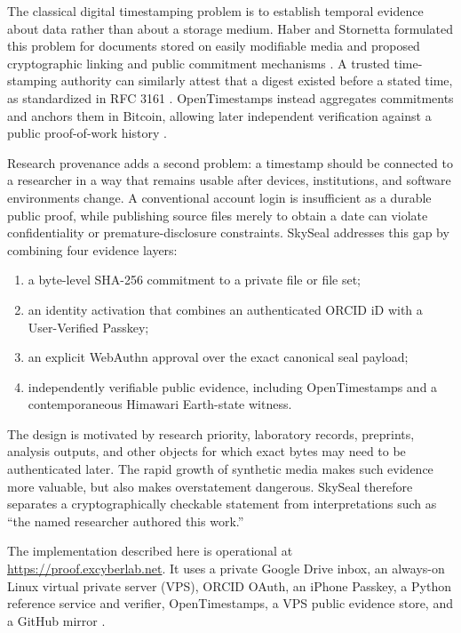 \documentclass[11pt,a4paper]{article}
\begin{document}
The classical digital timestamping problem is to establish temporal evidence about data rather than about a storage medium. Haber and Stornetta formulated this problem for documents stored on easily modifiable media and proposed cryptographic linking and public commitment mechanisms \cite{haber1991}. A trusted time-stamping authority can similarly attest that a digest existed before a stated time, as standardized in RFC 3161 \cite{rfc3161}. OpenTimestamps instead aggregates commitments and anchors them in Bitcoin, allowing later independent verification against a public proof-of-work history \cite{nakamoto2008,ots2026}.

Research provenance adds a second problem: a timestamp should be connected to a researcher in a way that remains usable after devices, institutions, and software environments change. A conventional account login is insufficient as a durable public proof, while publishing source files merely to obtain a date can violate confidentiality or premature-disclosure constraints. SkySeal addresses this gap by combining four evidence layers:

\begin{enumerate}
  \item a byte-level SHA-256 commitment to a private file or file set;
  \item an identity activation that combines an authenticated ORCID iD with a User-Verified Passkey;
  \item an explicit WebAuthn approval over the exact canonical seal payload;
  \item independently verifiable public evidence, including OpenTimestamps and a contemporaneous Himawari Earth-state witness.
\end{enumerate}

The design is motivated by research priority, laboratory records, preprints, analysis outputs, and other objects for which exact bytes may need to be authenticated later. The rapid growth of synthetic media makes such evidence more valuable, but also makes overstatement dangerous. SkySeal therefore separates a cryptographically checkable statement from interpretations such as ``the named researcher authored this work.''

The implementation described here is operational at \url{https://proof.excyberlab.net}. It uses a private Google Drive inbox, an always-on Linux virtual private server (VPS), ORCID OAuth, an iPhone Passkey, a Python reference service and verifier, OpenTimestamps, a VPS public evidence store, and a GitHub mirror \cite{skyseal2026}.
\end{document}
